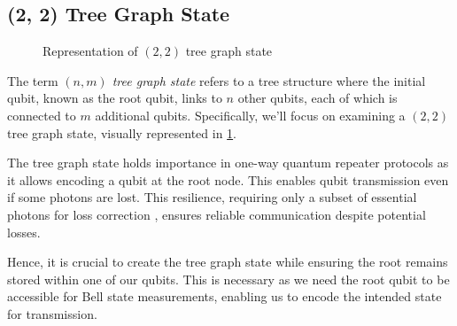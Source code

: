 \subsection{(2, 2) Tree Graph State}
\label{sec:2_2_tree}

\begin{figure}
    \centering
    
    \vspace{-1cm}
    \caption{Representation of $(2, 2)$ tree graph state}
    \label{fig:2_2_graph}
\end{figure}

The term \emph{$(n, m)$ tree graph state} refers to a tree structure where the initial qubit, known as the root qubit, links to $n$ other qubits, each of which is connected to $m$ additional qubits.
Specifically, we'll focus on examining a $(2, 2)$ tree graph state, visually represented in \cref{fig:2_2_graph}.

The tree graph state holds importance in one-way quantum repeater protocols as it allows encoding a qubit at the root node.
This enables qubit transmission even if some photons are lost.
This resilience, requiring only a subset of essential photons for loss correction \cite{Why_tree_graph_state}, ensures reliable communication despite potential losses.

Hence, it is crucial to create the tree graph state while ensuring the root remains stored within one of our qubits.
This is necessary as we need the root qubit to be accessible for Bell state measurements, enabling us to encode the intended state for transmission.

